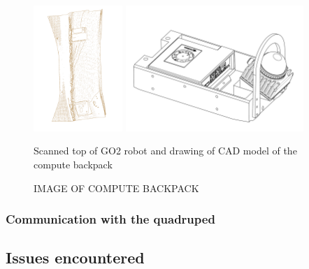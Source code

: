 \documentclass[11pt]{article}
\begin{document}
        \begin{figure}[H]
            \centering
            \includegraphics[width=0.3\textwidth]{Images/ScanGO2Top.pdf}
            \includegraphics[width=0.6\textwidth]{Images/ComputeBackpack.pdf}
            \caption{Scanned top of GO2 robot and drawing of CAD model of the compute backpack }
            \label{fig:scanner_and_cad}
        \end{figure}




        \begin{figure}[H]
            \centering
            \color{red}
            IMAGE OF COMPUTE BACKPACK
        \end{figure}


        
        \subsubsection{Communication with the quadruped}

        
    \subsection{Issues encountered}
        
\end{document}
